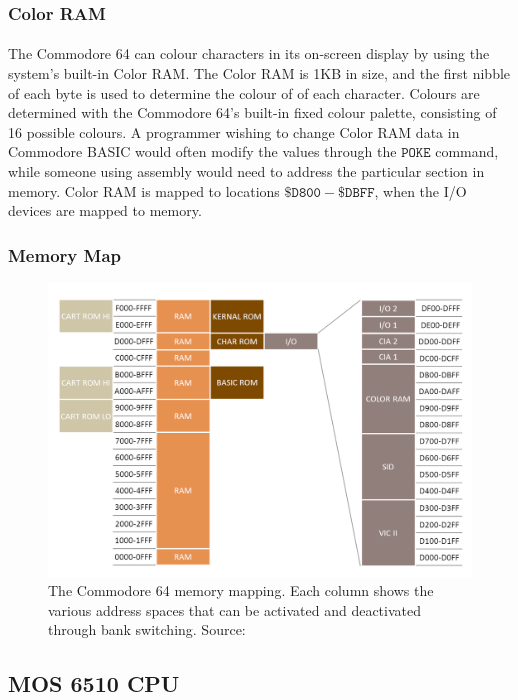 \documentclass{article}
\begin{document}
\subsubsection{Color RAM}
\paragraph{}
The Commodore 64 can colour characters in its on-screen display by using the system's built-in Color RAM. The Color RAM is 1KB in size, and the first nibble of each byte is used to determine the colour of of each character. Colours are determined with the Commodore 64's built-in fixed colour palette, consisting of 16 possible colours. A programmer wishing to change Color RAM data in Commodore BASIC would often modify the values through the $\mathtt{POKE}$ command, while someone using assembly would need to address the particular section in memory. Color RAM is mapped to locations $\mathtt{\$D800 - \$DBFF}$, when the I/O devices are mapped to memory.

\subsubsection{Memory Map}
\begin{figure}[h!]
  \centering
    \includegraphics[width=\textwidth]{memmap}
  \caption{The Commodore 64 memory mapping. Each column shows the various address spaces that can be activated and deactivated through bank switching. Source: \cite{memMap}}
\end{figure}

\subsection{MOS 6510 CPU}
\end{document}
